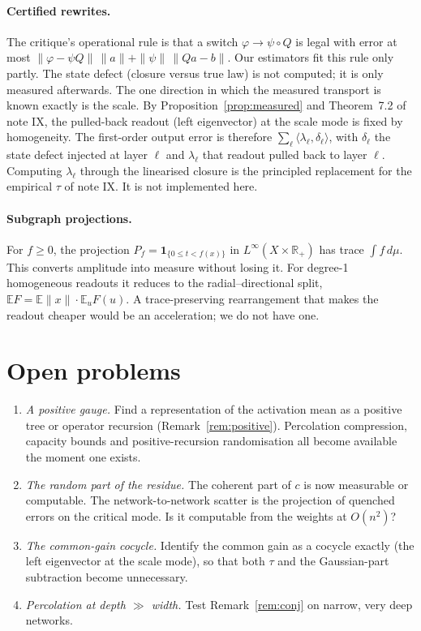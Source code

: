 \documentclass[11pt]{article}
\theoremstyle{definition}
\theoremstyle{remark}
\newcommand{\E}{\mathbb E}
\newcommand{\R}{\mathbb R}
\begin{document}
\paragraph{Certified rewrites.} The critique's operational rule is that a switch $\varphi\to\psi\circ Q$ is legal with error at most $\|\varphi-\psi Q\|\,\|a\|+\|\psi\|\,\|Qa-b\|$. Our estimators fit this rule only partly. The state defect (closure versus true law) is not computed; it is only measured afterwards. The one direction in which the measured transport is known exactly is the scale. By Proposition~\ref{prop:measured} and Theorem~7.2 of note IX, the pulled-back readout (left eigenvector) at the scale mode is fixed by homogeneity. The first-order output error is therefore $\sum_\ell\langle\lambda_\ell,\delta_\ell\rangle$, with $\delta_\ell$ the state defect injected at layer $\ell$ and $\lambda_\ell$ that readout pulled back to layer $\ell$. Computing $\lambda_\ell$ through the linearised closure is the principled replacement for the empirical $\tau$ of note IX. It is not implemented here.

\paragraph{Subgraph projections.} For $f\ge0$, the projection $P_f=\mathbf 1_{\{0\le t<f(x)\}}$ in $L^\infty(X\times\R_+)$ has trace $\int f\,d\mu$. This converts amplitude into measure without losing it. For degree-1 homogeneous readouts it reduces to the radial--directional split, $\E F=\E\|x\|\cdot\E_uF(u)$. A trace-preserving rearrangement that makes the readout cheaper would be an acceleration; we do not have one.

\section{Open problems}
\begin{enumerate}
\item \emph{A positive gauge.} Find a representation of the activation mean as a positive tree or operator recursion (Remark~\ref{rem:positive}). Percolation compression, capacity bounds and positive-recursion randomisation all become available the moment one exists.
\item \emph{The random part of the residue.} The coherent part of $c$ is now measurable or computable. The network-to-network scatter is the projection of quenched errors on the critical mode. Is it computable from the weights at $O(n^2)$?
\item \emph{The common-gain cocycle.} Identify the common gain as a cocycle exactly (the left eigenvector at the scale mode), so that both $\tau$ and the Gaussian-part subtraction become unnecessary.
\item \emph{Percolation at depth $\gg$ width.} Test Remark~\ref{rem:conj} on narrow, very deep networks.
\end{enumerate}
\end{document}
